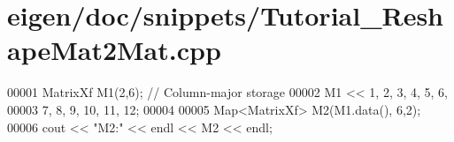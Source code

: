 \hypertarget{eigen_2doc_2snippets_2_tutorial___reshape_mat2_mat_8cpp_source}{}\section{eigen/doc/snippets/\+Tutorial\+\_\+\+Reshape\+Mat2\+Mat.cpp}
\label{eigen_2doc_2snippets_2_tutorial___reshape_mat2_mat_8cpp_source}

\begin{DoxyCode}
00001 MatrixXf M1(2,6);    \textcolor{comment}{// Column-major storage}
00002 M1 << 1, 2, 3,  4,  5,  6,
00003       7, 8, 9, 10, 11, 12;
00004 
00005 Map<MatrixXf> M2(M1.data(), 6,2);
00006 cout << \textcolor{stringliteral}{"M2:"} << endl << M2 << endl;
\end{DoxyCode}
